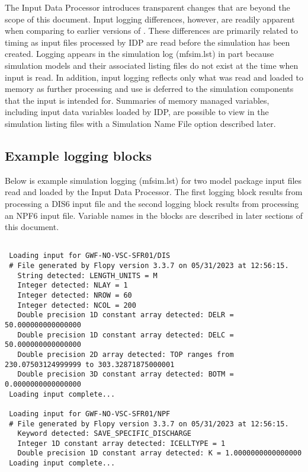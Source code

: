 The Input Data Processor introduces transparent changes that are beyond the scope of this document.  Input logging differences, however, are readily apparent when comparing to earlier versions of \mf.  These differences are primarily related to timing as input files processed by IDP are read before the simulation has been created.  Logging appears in the simulation log (mfsim.lst) in part because simulation models and their associated listing files do not exist at the time when input is read.  In addition, input logging reflects only what was read and loaded to memory as further processing and use is deferred to the simulation components that the input is intended for.  Summaries of memory managed variables, including input data variables loaded by IDP, are possible to view in the simulation listing files with a Simulation Name File option described later. 

\subsection{Example logging blocks}

Below is example simulation logging (mfsim.lst) for two model package input files read and loaded by the Input Data Processor.  The first logging block results from processing a DIS6 input file and the second logging block results from processing an NPF6 input file.  Variable names in the blocks are described in later sections of this document.

\small
\begin{lstlisting}[style=modeloutput]

 Loading input for GWF-NO-VSC-SFR01/DIS
 # File generated by Flopy version 3.3.7 on 05/31/2023 at 12:56:15.
   String detected: LENGTH_UNITS = M
   Integer detected: NLAY = 1
   Integer detected: NROW = 60
   Integer detected: NCOL = 200
   Double precision 1D constant array detected: DELR = 50.000000000000000
   Double precision 1D constant array detected: DELC = 50.000000000000000
   Double precision 2D array detected: TOP ranges from 230.07503124999999 to 303.32871875000001
   Double precision 3D constant array detected: BOTM = 0.0000000000000000
 Loading input complete...

 Loading input for GWF-NO-VSC-SFR01/NPF
 # File generated by Flopy version 3.3.7 on 05/31/2023 at 12:56:15.
   Keyword detected: SAVE_SPECIFIC_DISCHARGE
   Integer 1D constant array detected: ICELLTYPE = 1
   Double precision 1D constant array detected: K = 1.0000000000000000
 Loading input complete...
\end{lstlisting}
